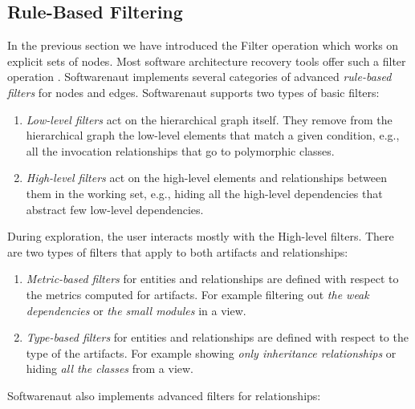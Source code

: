 \documentclass[preprint,12pt]{elsarticle}
\begin{document}
\subsection {Rule-Based Filtering}

In the previous section we have introduced the Filter operation which works on explicit sets of nodes. Most software architecture recovery tools offer such a filter operation \cite{aracic-filtering}. Softwarenaut implements several categories of advanced {\em rule-based filters} for nodes and edges. Softwarenaut supports two types of basic filters: 

\begin{enumerate}

\item {\em Low-level filters} act on the hierarchical graph itself. They remove from the hierarchical graph the low-level elements that match a given condition, e.g., all the invocation relationships that go to polymorphic classes.

\item {\em High-level filters} act on the high-level elements and relationships between them in the working set, e.g., hiding all the high-level dependencies that abstract few low-level dependencies.

\end{enumerate}

During exploration, the user interacts mostly with the High-level filters. There are two types of filters that apply to both artifacts and relationships: 

\begin{enumerate}
\item {\em Metric-based filters} for entities and relationships are defined with respect to the metrics computed for artifacts. For example filtering out {\em the weak dependencies} or {\em the small modules} in a view.
\item {\em Type-based filters} for entities and relationships are defined with respect to the type of the artifacts. For example showing {\em only inheritance relationships} or hiding {\em all the classes} from a view.
\end{enumerate}

Softwarenaut also implements advanced filters for relationships:
\end{document}
